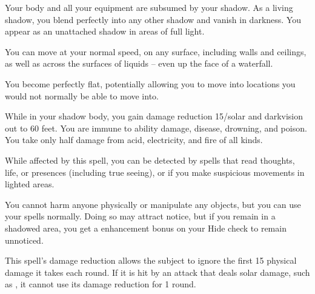\spelldur{\durmed \dismissable}
\begin{spelleffect}
    Your body and all your equipment are subsumed by your shadow. As a living shadow, you blend perfectly into any other shadow and vanish in darkness. You appear as an unattached shadow in areas of full light.
    \par You can move at your normal speed, on any surface, including walls and ceilings, as well as across the surfaces of liquids -- even up the face of a waterfall.
    \par You become perfectly flat, potentially allowing you to move into locations you would not normally be able to move into.
    \par While in your shadow body, you gain damage reduction 15/solar and darkvision out to 60 feet. You are immune to ability damage, disease, drowning, and poison. You take only half damage from acid, electricity, and fire of all kinds.
    \par While affected by this spell, you can be detected by spells that read thoughts, life, or presences (including true seeing), or if you make suspicious movements in lighted areas.
    \par You cannot harm anyone physically or manipulate any objects, but you can use your spells normally. Doing so may attract notice, but if you remain in a shadowed area, you get a  enhancement bonus on your Hide check to remain unnoticed.
\end{spelleffect}
\begin{spellnotes}
    This spell's damage reduction allows the subject to ignore the first 15 physical damage it takes each round. If it is hit by an attack that deals solar damage, such as , it cannot use its damage reduction for 1 round.
\end{spellnotes}

